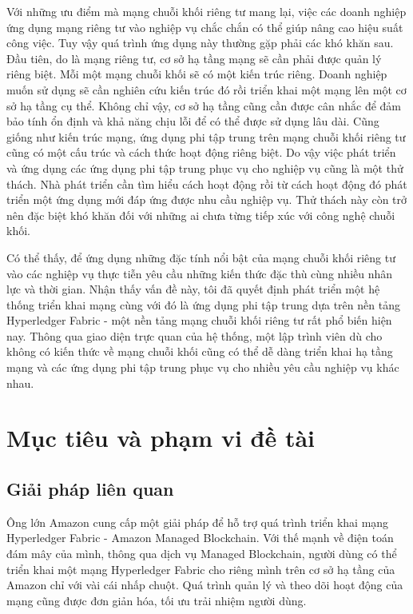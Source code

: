 \documentclass[../DoAn.tex]{subfiles}
\begin{document}
Với những ưu điểm mà mạng chuỗi khối riêng tư mang lại, việc các doanh nghiệp ứng dụng mạng riêng tư vào nghiệp vụ chắc chắn có thể giúp nâng cao hiệu suất công việc. Tuy vậy quá trình ứng dụng này thường gặp phải các khó khăn sau. Đầu tiên, do là mạng riêng tư, cơ sở hạ tầng mạng sẽ cần phải được quản lý riêng biệt. Mỗi một mạng chuỗi khối sẽ có một kiến trúc riêng. Doanh nghiệp muốn sử dụng sẽ cần nghiên cứu kiến trúc đó rồi triển khai một mạng lên một cơ sở hạ tầng cụ thể. Không chỉ vậy, cơ sở hạ tầng cũng cần được cân nhắc để đảm bảo tính ổn định và khả năng chịu lỗi để có thể được sử dụng lâu dài. Cũng giống như kiến trúc mạng, ứng dụng phi tập trung trên mạng chuỗi khối riêng tư cũng có một cấu trúc và cách thức hoạt động riêng biệt. Do vậy việc phát triển và ứng dụng các ứng dụng phi tập trung phục vụ cho nghiệp vụ cũng là một thử thách. Nhà phát triển cần tìm hiểu cách hoạt động rồi từ cách hoạt động đó phát triển một ứng dụng mới đáp ứng được nhu cầu nghiệp vụ. Thử thách này còn trở nên đặc biệt khó khăn đối với những ai chưa từng tiếp xúc với công nghệ chuỗi khối.

Có thể thấy, để ứng dụng những đặc tính nổi bật của mạng chuỗi khối riêng tư vào các nghiệp vụ thực tiễn yêu cầu những kiến thức đặc thù cùng nhiều nhân lực và thời gian. Nhận thấy vấn đề này, tôi đã quyết định phát triển một hệ thống triển khai mạng cùng với đó là ứng dụng phi tập trung dựa trên nền tảng Hyperledger Fabric - một nền tảng mạng chuỗi khối riêng tư rất phổ biến hiện nay. Thông qua giao diện trực quan của hệ thống, một lập trình viên dù cho không có kiến thức về mạng chuỗi khối cũng có thể dễ dàng triển khai hạ tầng mạng và các ứng dụng phi tập trung phục vụ cho nhiều yêu cầu nghiệp vụ khác nhau.

\section{Mục tiêu và phạm vi đề tài}
\label{section:1.2}

\subsection{Giải pháp liên quan}
Ông lớn Amazon cung cấp một giải pháp để hỗ trợ quá trình triển khai mạng Hyperledger Fabric - Amazon Managed Blockchain\cite{amazon}. Với thế mạnh về điện toán đám mây của mình, thông qua dịch vụ Managed Blockchain, người dùng có thể triển khai một mạng Hyperledger Fabric cho riêng mình trên cơ sở hạ tầng của Amazon chỉ với vài cái nhấp chuột. Quá trình quản lý và theo dõi hoạt động của mạng cũng được đơn giản hóa, tối ưu trải nhiệm người dùng. 
\end{document}
